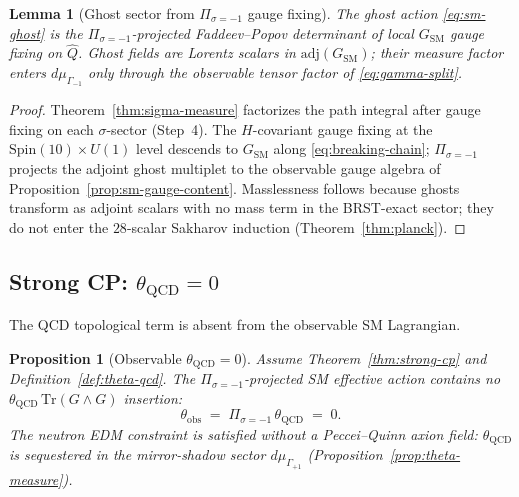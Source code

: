\documentclass[11pt]{article}
\theoremstyle{plain}
\newtheorem{lemma}[theorem]{Lemma}
\newtheorem{proposition}[theorem]{Proposition}
\theoremstyle{definition}
\theoremstyle{remark}
\numberwithin{equation}{section}
\newcommand{\Spin}{\mathrm{Spin}}
\begin{document}
\begin{lemma}[Ghost sector from $\Pi_{\sigma=-1}$ gauge fixing]
\label{lem:sm-ghost-derived}
The ghost action \eqref{eq:sm-ghost} is the $\Pi_{\sigma=-1}$-projected
Faddeev--Popov determinant of local $G_{\mathrm{SM}}$ gauge fixing on
$\hat Q$. Ghost fields are Lorentz scalars in $\mathrm{adj}(G_{\mathrm{SM}})$;
their measure factor enters $d\mu_{\Gamma_{-1}}$ only through the observable
tensor factor of \eqref{eq:gamma-split}.
\end{lemma}

\begin{proof}
Theorem~\ref{thm:sigma-measure} factorizes the path integral after gauge
fixing on each $\sigma$-sector (Step~4). The $H$-covariant gauge fixing at the
$\Spin(10)\times U(1)$ level descends to $G_{\mathrm{SM}}$ along
\eqref{eq:breaking-chain}; $\Pi_{\sigma=-1}$ projects the adjoint ghost
multiplet to the observable gauge algebra of
Proposition~\ref{prop:sm-gauge-content}. Masslessness follows because ghosts
transform as adjoint scalars with no mass term in the BRST-exact sector; they
do not enter the $28$-scalar Sakharov induction (Theorem~\ref{thm:planck}).
\end{proof}

\subsection{Strong CP: $\theta_{\mathrm{QCD}}=0$}
\label{sec:sm-lagrangian:theta}

The QCD topological term is absent from the observable SM Lagrangian.

\begin{proposition}[Observable $\theta_{\mathrm{QCD}}=0$]
\label{prop:sm-theta-zero}
Assume Theorem~\ref{thm:strong-cp} and Definition~\ref{def:theta-qcd}. The
$\Pi_{\sigma=-1}$-projected SM effective action contains no
$\theta_{\mathrm{QCD}}\,\mathrm{Tr}(G\wedge G)$ insertion:
\begin{equation}\label{eq:sm-theta-zero}
  \theta_{\mathrm{obs}}
  \;=\;
  \Pi_{\sigma=-1}\,\theta_{\mathrm{QCD}}
  \;=\;
  0.
\end{equation}
The neutron EDM constraint is satisfied without a Peccei--Quinn axion field:
$\theta_{\mathrm{QCD}}$ is sequestered in the mirror-shadow sector
$d\mu_{\Gamma_{+1}}$ (Proposition~\ref{prop:theta-measure}).
\end{proposition}
\end{document}
